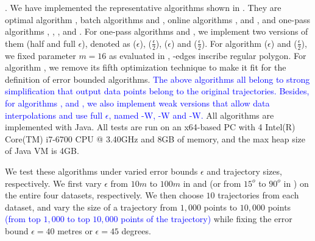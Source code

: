 .
We have implemented the representative algorithms shown in .
 They are optimal algorithm \opt, batch algorithms \dpa and \tpa, online algorithms  \opwa, \bqsa and \squishe, and one-pass algorithms  \operb, \siped, \cised, \intersec and \interval.
For one-pass algorithms \siped and \cised, we implement two versions of them (half and full $\epsilon$), denoted as \siped($\epsilon$), \siped($\frac{\epsilon}{2}$), \cised($\epsilon$) and \cised($\frac{\epsilon}{2}$). 
For algorithm \cised($\epsilon$) and \cised($\frac{\epsilon}{2}$), we fixed parameter $m=16$ as evaluated in \cite{Lin:Cised}, -edges inscribe regular polygon.
{For algorithm \operb, we remove its fifth optimization technique to make it fit for the definition of error bounded algorithms.}
\textcolor{blue}{The above algorithms all belong to strong simplification that output data points belong to the original trajectories.}
\textcolor{blue}{Besides, for algorithms \operb, \siped and \cised, we also implement weak versions that allow data interpolations and use full $\epsilon$, named \operb-W, \siped-W and \cised-W.}
All algorithms are implemented with Java.
All tests are run on an x64-based  PC with 4 Intel(R) Core(TM) i7-6700 CPU @
3.40GHz  and 8GB of memory, and {the max heap size of Java VM is 4GB.}


We test these algorithms under varied error bounds $\epsilon$ and trajectory sizes, respectively. We first vary $\epsilon$ from $10m$ to $100m$ in \ped and \sed (or from $15^o$ to $90^o$ in \dad) on the entire four datasets, respectively. We then choose $10$ trajectories from each dataset, and vary the size  of a trajectory from $1,000$ points to $10,000$ points \textcolor{blue}{(\ie from top $1,000$ to top $10,000$ points of the trajectory)} while fixing the error bound $\epsilon=40$ metres or $\epsilon=45$ degrees.

